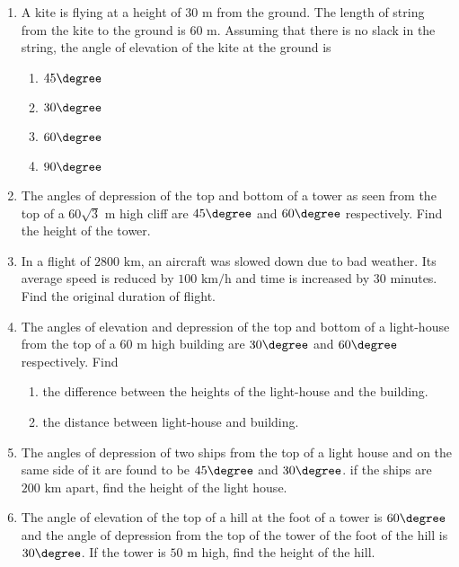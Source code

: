 \begin{enumerate}
\item A kite is flying at a height of $30 \text{ m}$ from the ground. The length of string from the kite to the ground is $60 \text{ m}$. Assuming that there is no slack in the string, the angle of elevation of the kite at the ground is\\
\begin{enumerate}
\item $45\degree$\\
\item $30\degree$\\
\item $60\degree$\\
\item $90\degree$\\
\end{enumerate}
\item The angles of depression of the top and bottom of a tower as seen from the top of a $60\sqrt 3 \text{ m}$ high cliff are $45\degree$ and $60\degree$ respectively. Find the height of the tower.\\
\item In a flight of $2800 \text{ km}$, an aircraft was slowed down due to bad weather. Its average speed is reduced by $100 \text{ km/h}$ and time is increased by $30$ minutes. Find the original duration of flight.\\
\item The angles of elevation and depression of the top and bottom of a light-house from the top of a $60 \text{ m}$ high building are $30\degree$ and $60\degree$ respectively. Find\\
\begin{enumerate}[label=\Roman*.]
\item the difference between the heights of the light-house and the building.\\
\item the distance between light-house and building.\\
\end{enumerate}
\item The angles of depression of two ships from the top of a light house and on the same side of it are found to be $45\degree$ and $30\degree$. if the ships are $200 \text{ km}$ apart, find the height of the light house.\\
\item The angle of elevation of the top of a hill at the foot of a tower is $60\degree$ and the angle of depression from the top of the tower of the foot of the hill is $30\degree$. If the tower is $50\text{ m}$ high, find the height of the hill.\\

\end{enumerate}

